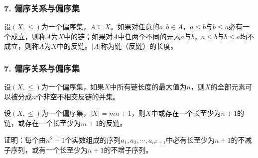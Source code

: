 \documentclass{beamer}
\begin{document}
\begin{CJK*}{UTF8}{gbsn}
\begin{frame}
  \frametitle{7. 偏序关系与偏序集}
  \begin{Def}\justifying\let\raggedright\justifying
    设$(X,\leq)$为一个偏序集，$A\subseteq X$。如果对任意的$a,b\in A$，$a\leq b$与$b\leq a$必有一个成立，则称$A$为$X$中的链；如果对$A$中任两个不同的元素$a$与$b$，$a\leq b$与$b\leq a$均不成立，则称$A$为$X$中的反链。$|A|$称为链（反链）的长度。
  \end{Def}
\end{frame}

\begin{frame}
  \frametitle{7. 偏序关系与偏序集}
  \begin{Thm}
    设$(X,\leq)$为一个偏序集，如果$X$中所有链长度的最大值为$n$，则$X$的全部元素可以被分成$n$个非空不相交反链的并集。
  \end{Thm}\pause
  \begin{Cor}
    设$(X,\leq)$为一个偏序集，$|X|=mn+1$，则$X$中或存在一个长至少为$n+1$的链，或存在一个长至少为$m+1$的反链。
  \end{Cor}\pause
  \begin{Ex}
    证明：每个由$n^2+1$个实数组成的序列$a_1,a_2,\cdots,a_{n^2+1}$中必有长至少为$n+1$的不减子序列，或有一个长至少为$n+1$的不增子序列。
  \end{Ex}
\end{frame}
   

\end{CJK*}
\end{document}
